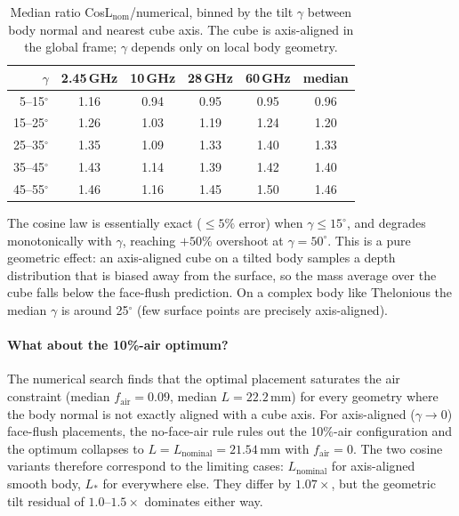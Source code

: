 \documentclass[11pt,a4paper]{article}
\theoremstyle{definition}
\theoremstyle{remark}
\begin{document}
\begin{table}[ht]
\centering
\caption{Median ratio CosL$_{\mathrm{nom}}$/numerical, binned by the
tilt $\gamma$ between body normal and nearest cube axis. The cube is
axis-aligned in the global frame; $\gamma$ depends only on local body
geometry.}
\label{tab:gamma-bins}
\begin{tabular}{rccccc}
\toprule
$\gamma$ & 2.45\,GHz & 10\,GHz & 28\,GHz & 60\,GHz & median \\
\midrule
5--15$^\circ$  & 1.16 & 0.94 & 0.95 & 0.95 & 0.96 \\
15--25$^\circ$ & 1.26 & 1.03 & 1.19 & 1.24 & 1.20 \\
25--35$^\circ$ & 1.35 & 1.09 & 1.33 & 1.40 & 1.33 \\
35--45$^\circ$ & 1.43 & 1.14 & 1.39 & 1.42 & 1.40 \\
45--55$^\circ$ & 1.46 & 1.16 & 1.45 & 1.50 & 1.46 \\
\bottomrule
\end{tabular}
\end{table}

The cosine law is essentially exact ($\le 5\%$ error) when
$\gamma \le 15^\circ$, and degrades monotonically with $\gamma$, reaching
$+50\%$ overshoot at $\gamma=50^\circ$. This is a pure geometric
effect: an axis-aligned cube on a tilted body samples a depth
distribution that is biased away from the surface, so the mass average
over the cube falls below the face-flush prediction. On a complex body
like Thelonious the median $\gamma$ is around 25$^\circ$
(few surface points are precisely axis-aligned).

\paragraph{What about the 10\%-air optimum?} The numerical search
finds that the optimal placement saturates the air constraint
(median $f_{\mathrm{air}} = 0.09$, median $L = 22.2$\,mm) for every
geometry where the body normal is not exactly aligned with a cube axis.
For axis-aligned ($\gamma \to 0$) face-flush placements, the no-face-air
rule rules out the 10\%-air configuration and the optimum collapses to
$L = L_{\mathrm{nominal}} = 21.54$\,mm with $f_{\mathrm{air}} = 0$.
The two cosine variants therefore correspond to the limiting cases:
$L_{\mathrm{nominal}}$ for axis-aligned smooth body, $L_*$ for everywhere
else. They differ by $1.07\times$, but the geometric tilt residual of
$1.0$--$1.5\times$ dominates either way.
\end{document}
